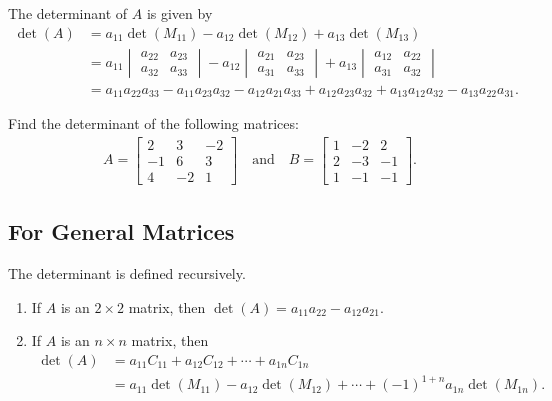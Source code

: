 \documentclass[12pt,a4paper]{article}
\newcounter{example}[section]
\begin{document}
	\newpage
	
	\noindent The determinant of $A$ is given by
		\begin{align*}
		\det (A) &= a_{11} \det (M_{11}) - a_{12} \det (M_{12}) + a_{13} \det (M_{13})   \\
		&=a_{11}
		\begin{vmatrix}
		a_{22} & a_{23} \\ a_{32} & a_{33}
		\end{vmatrix}
		- a_{12}
		\begin{vmatrix}
		a_{21} & a_{23} \\ a_{31} & a_{33}
		\end{vmatrix}
		+ a_{13}
		\begin{vmatrix}
		a_{12} & a_{22} \\ a_{31} & a_{32}
		\end{vmatrix} \\
		& = a_{11} a_{22} a_{33} - a_{11} a_{23} a_{32} - a_{12} a_{21} a_{33} + a_{12} a_{23} a_{32} + a_{13} a_{12}a_{32} - a_{13} a_{22} a_{31} .
		\end{align*}

	\begin{example}\label{Example:3x3Determinants}
	Find the determinant of the following matrices:
		\begin{align*}
		A = \begin{bmatrix}
		2 & 3 & -2 \\ -1 & 6 & 3 \\ 4 & -2 & 1
		\end{bmatrix}
		\quad \text{and} \quad
		B = \begin{bmatrix}
		1 & -2 & 2 \\ 2 & -3 & -1 \\ 1 & -1 & -1
		\end{bmatrix} .
		\end{align*}
	\end{example}

	\newpage
	
	\subsection{For General Matrices}
	The determinant is defined recursively.
		\begin{enumerate}
		\item If $A$ is an $2 \times 2$ matrix, then $\det (A) = a_{11} a_{22} - a_{12}a_{21}$.
		\item If $A$ is an $n \times n$ matrix, then
			\begin{align*}
			\det (A) &= a_{11} C_{11} + a_{12} C_{12} + \cdots + a_{1n} C_{1n} \\
			&= a_{11} \det (M_{11}) - a_{12} \det (M_{12}) + \cdots + (-1)^{1 + n} a_{1n} \det (M_{1n}) .
			\end{align*}
		\end{enumerate}
		
\end{document}
